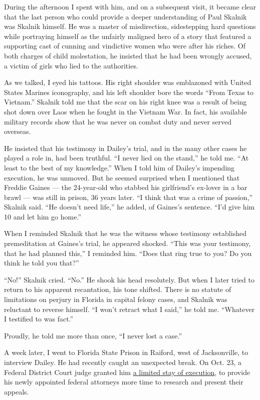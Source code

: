 During the afternoon I spent with him, and on a subsequent visit, it
became clear that the last person who could provide a deeper
understanding of Paul Skalnik was Skalnik himself. He was a master of
misdirection, sidestepping hard questions while portraying himself as
the unfairly maligned hero of a story that featured a supporting cast of
cunning and vindictive women who were after his riches. Of both charges
of child molestation, he insisted that he had been wrongly accused, a
victim of girls who lied to the authorities.

As we talked, I eyed his tattoos. His right shoulder was emblazoned with
United States Marines iconography, and his left shoulder bore the words
``From Texas to Vietnam.'' Skalnik told me that the scar on his right
knee was a result of being shot down over Laos when he fought in the
Vietnam War. In fact, his available military records show that he was
never on combat duty and never served overseas.

He insisted that his testimony in Dailey's trial, and in the many other
cases he played a role in, had been truthful. ``I never lied on the
stand,'' he told me. ``At least to the best of my knowledge.'' When I
told him of Dailey's impending execution, he was unmoved. But he seemed
surprised when I mentioned that Freddie Gaines --- the 24-year-old who
stabbed his girlfriend's ex-lover in a bar brawl --- was still in
prison, 36 years later. ``I think that was a crime of passion,'' Skalnik
said. ``He doesn't need life,'' he added, of Gaines's sentence. ``I'd
give him 10 and let him go home.''

When I reminded Skalnik that he was the witness whose testimony
established premeditation at Gaines's trial, he appeared shocked. ``This
was your testimony, that he had planned this,'' I reminded him. ``Does
that ring true to you? Do you think he told you that?''

``No!'' Skalnik cried. ``No.'' He shook his head resolutely. But when I
later tried to return to his apparent recantation, his tone shifted.
There is no statute of limitations on perjury in Florida in capital
felony cases, and Skalnik was reluctant to reverse himself. ``I won't
retract what I said,'' he told me. ``Whatever I testified to was fact.''

Proudly, he told me more than once, ``I never lost a case.''

A week later, I went to Florida State Prison in Raiford, west of
Jacksonville, to interview Dailey. He had recently caught an unexpected
break. On Oct. 23, a Federal District Court judge granted him
\href{https://www.tampabay.com/news/crime/2019/10/23/federal-judge-grants-james-dailey-temporary-stay-of-execution/}{a
limited stay of execution}, to provide his newly appointed federal
attorneys more time to research and present their appeals.


